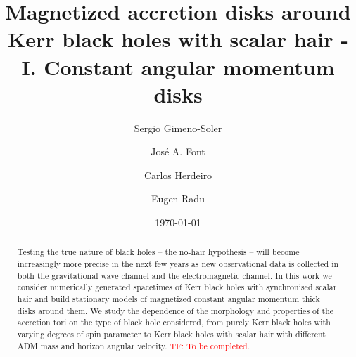 \documentclass[twocolumn,aps,showpacs,showkeys,prd,superscriptaddress,byrevtex, amsmath]{revtex4-1}
\begin{document}

\renewcommand{\t}{\times}
\newcommand{\sg}[1]{\textcolor{blue}{SG: #1}}
\newcommand{\tf}[1]{\textcolor{red}{TF: #1}}

\long{}



\title{Magnetized accretion disks around Kerr black holes with scalar hair - I. Constant angular momentum disks} 

\author{Sergio Gimeno-Soler}

\author{Jos\'e A. Font}

\author{Carlos Herdeiro}

\author{Eugen Radu}



\date{\today}



\begin{abstract} 
Testing the true nature of black holes -- the no-hair hypothesis -- will become increasingly more precise in the next few years as new observational data is collected in both the gravitational wave channel and the electromagnetic channel. In this work we consider numerically generated spacetimes of Kerr black holes with synchronised scalar hair and build stationary models of magnetized constant angular momentum thick disks around them. We study the dependence of the morphology and properties of the accretion tori on the type of black hole considered, from purely Kerr black holes with varying degrees of  spin parameter to Kerr black holes with scalar hair with different ADM mass and horizon angular velocity. \tf{To be completed.}
\end{abstract}
\end{document}
